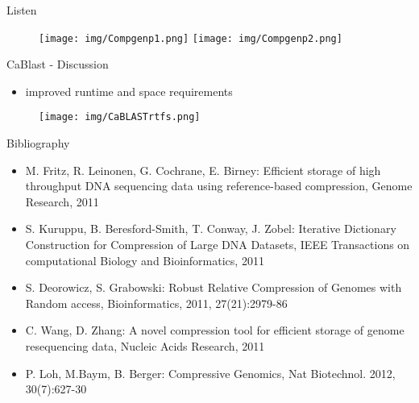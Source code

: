 \documentclass[aspectratio=1610]{beamer}
\begin{document}
\begin{frame}[plain]{Listen}
\vfill
\begin{center}
  \begin{figure}
    \texttt{[image: img/Compgenp1.png]}
    \texttt{[image: img/Compgenp2.png]}
  \end{figure}
  \end{center}
\end{frame}

\begin{frame}{CaBlast - Discussion}
  \begin{itemize}
    \item improved runtime and space requirements
  \end{itemize}
  \begin{center}
    \begin{figure}
      \texttt{[image: img/CaBLASTrtfs.png]}
    \end{figure}
  \end{center}
\end{frame}

\begin{frame}{Bibliography}
  \begin{itemize}
    \item M. Fritz, R. Leinonen, G. Cochrane, E. Birney: Efficient storage of high throughput DNA sequencing data using 
      reference-based compression, Genome Research, 2011
    \item S. Kuruppu, B. Beresford-Smith, T. Conway, J. Zobel: Iterative Dictionary Construction for Compression of Large
      DNA Datasets, IEEE Transactions on computational Biology and Bioinformatics, 2011
    \item S. Deorowicz, S. Grabowski: Robust Relative Compression of Genomes with Random access, Bioinformatics, 2011, 
      27(21):2979-86
    \item C. Wang, D. Zhang: A novel compression tool for efficient storage of genome resequencing data, Nucleic Acids
      Research, 2011
    \item P. Loh, M.Baym, B. Berger: Compressive Genomics, Nat Biotechnol. 2012, 30(7):627-30
  \end{itemize}
\end{frame}
\end{document}
